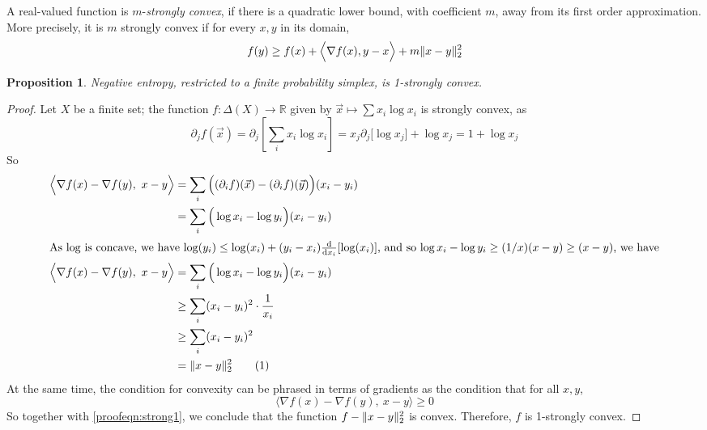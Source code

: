 \documentclass{article}
\theoremstyle{plain}
\newtheorem{prop}[theorem]{Proposition}
\theoremstyle{definition}
\theoremstyle{remark}
\DeclarePairedDelimiter{\norm}{\lVert}{\rVert}
\newcommand\numberthis{\addtocounter{equation}{1}\tag{\theequation}}
\numberwithin{equation}{section}
\begin{document}
	\begin{defn} \label{def:strong-convexity}
		A real-valued function is $m$-\emph{strongly convex}, if there is a quadratic lower bound, with coefficient $m$, away from its first order approximation. More precisely, it is $m$ strongly convex if for every $x, y$ in its domain, 
		\[ f(y) \geq f(x) + \Big\langle\nabla f(x), y-x \Big\rangle + m\norm{x-y}^2_2 \]
	\end{defn}


	\begin{prop}\label{prop:neg-ent-convex}
	  Negative entropy, restricted to a finite probability
				simplex, is 1-strongly convex. 
	\end{prop}
	\begin{proof}
		Let $X$ be a finite set; the function $f: \Delta(X) \to \mathbb R$ given by $\vec x \mapsto \sum x_i \log x_i$ is strongly convex, as 
		\begin{equation*}
			\partial_j f(\vec x) =  \partial_j\left[\sum_i x_i \log x_i \right] = 
				x_j \partial_j \big[\log x_j \big] + \log x_j = 1 + \log x_j
		\end{equation*}
		So
		\begin{align*}
			\Big\langle \nabla f(x) - \nabla f(y),~ x-y\Big\rangle 
				&= \sum_i \Big((\partial_i f)(\vec x) - (\partial_i f)(\vec y)\Big)(x_i - y_i) \\
				&= \sum_i \Big(\log x_i  - \log y_i \Big)(x_i - y_i) \\
			\intertext{As $\log$ is concave, we have $\log(y_i) \leq \log(x_i) + (y_i-x_i) \frac{\mathrm d}{\mathrm d x_i} [\log(x_i)]$, and so $\log x_i - \log y_i \geq (1/x) (x - y)  \geq (x-y)$, we have}
			\Big\langle \nabla f(x) - \nabla f(y),~ x-y\Big\rangle
				&= \sum_i \Big(\log x_i  - \log y_i \Big)(x_i - y_i) \\ %
				&\geq \sum_i (x_i-y_i)^2 \cdot \frac1{x_i}\\
				&\geq \sum_i (x_i-y_i)^2 \\
				&= \norm{x-y}^2_2 \numberthis\label{proofeqn:strong1}
		\end{align*}
		At the same time, the condition for convexity can be phrased in terms of gradients as the condition that for all $x,y$,
		\[  \Big\langle \nabla f(x) - \nabla f(y),~ x-y\Big\rangle \geq 0\]
		So together with \eqref{proofeqn:strong1}, we conclude that the function $f - \norm{x-y}^2_2$ is convex. Therefore, $f$ is 1-strongly convex.
	\end{proof}
\end{document}
